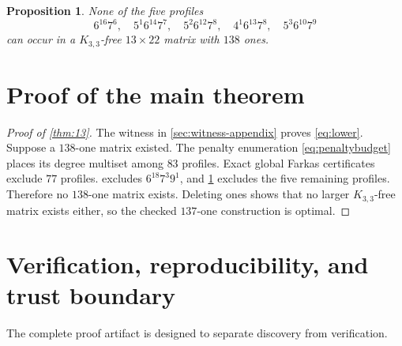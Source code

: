 \documentclass[10pt,a4paper]{amsart}
\newtheorem{proposition}[theorem]{Proposition}
\begin{document}
\begin{proposition}\label{prop:five}
None of the five profiles
\[
6^{16}7^6,
\quad5^1 6^{14}7^7,
\quad5^2 6^{12}7^8,
\quad4^1 6^{13}7^8,
\quad5^3 6^{10}7^9
\]
can occur in a $K_{3,3}$-free $13\times22$ matrix with $138$ ones.
\end{proposition}

\section{Proof of the main theorem}

\begin{proof}[Proof of \cref{thm:13}]
The witness in \cref{sec:witness-appendix} proves \eqref{eq:lower}. Suppose a $138$-one matrix existed. The penalty enumeration \eqref{eq:penaltybudget} places its degree multiset among $83$ profiles. Exact global Farkas certificates exclude $77$ profiles.  excludes $6^{18}7^3 9^1$, and \cref{prop:five} excludes the five remaining profiles. Therefore no $138$-one matrix exists. Deleting ones shows that no larger $K_{3,3}$-free matrix exists either, so the checked $137$-one construction is optimal.
\end{proof}


\section{Verification, reproducibility, and trust boundary}
The complete proof artifact is designed to separate discovery from verification.
\end{document}
